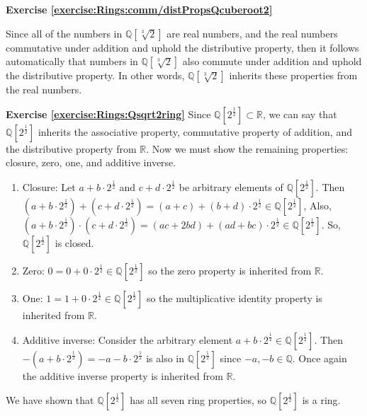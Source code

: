 \noindent\textbf{Exercise \ref{exercise:Rings:comm/distPropsQcuberoot2}}

Since all of the numbers in ${\mathbb Q}[\sqrt[3]{2}]$ are real numbers, and the real numbers commutative under addition and uphold the distributive property, then it follows automatically that numbers in ${\mathbb Q}[\sqrt[3]{2}]$ also commute under addition and uphold the distributive property.  In other words, ${\mathbb Q}[\sqrt[3]{2}]$ inherits these properties from the real numbers.

\noindent\textbf{Exercise \ref{exercise:Rings:Qsqrt2ring}}
Since ${\mathbb Q}[2^\frac{1}{2}]\subset{\mathbb R}$, we can say that ${\mathbb Q}[2^\frac{1}{2}]$ inherits the associative property, commutative property of addition, and the distributive property from ${\mathbb R}$.  Now we must show the remaining properties:  closure, zero, one, and additive inverse.
\begin{enumerate}
    \item Closure:  Let $a+b\cdot 2^\frac{1}{2}$ and $c+d\cdot 2^\frac{1}{2}$ be arbitrary elements of ${\mathbb Q}[2^\frac{1}{2}]$.  Then $(a+b\cdot 2^\frac{1}{2})+(c+d\cdot 2^\frac{1}{2})=(a+c)+(b+d)\cdot 2^\frac{1}{2}\in{\mathbb Q}[2^\frac{1}{2}]$,  Also, $(a+b\cdot 2^\frac{1}{2})\cdot (c+d\cdot 2^\frac{1}{2})=(ac+2bd)+(ad+bc)\cdot 2^\frac{1}{2}\in{\mathbb Q}[2^\frac{1}{2}]$.  So, ${\mathbb Q}[2^\frac{1}{2}]$ is closed.
    \item Zero:  $0=0+0\cdot 2^\frac{1}{2}\in{\mathbb Q}[2^\frac{1}{2}]$ so the zero property is inherited from ${\mathbb R}$.
    \item One:  $1=1+0\cdot 2^\frac{1}{2}\in{\mathbb Q}[2^\frac{1}{2}]$ so the multiplicative identity property is inherited from ${\mathbb R}$.
    \item Additive inverse:  Consider the arbitrary element $a+b\cdot 2^\frac{1}{2}\in{\mathbb Q}[2^\frac{1}{2}]$.  Then $-(a+b\cdot 2^\frac{1}{2})=-a-b\cdot 2^\frac{1}{2}$ is also in ${\mathbb Q}[2^\frac{1}{2}]$  since $-a,-b\in{\mathbb Q}$.  Once again the additive inverse property is inherited from ${\mathbb R}$.
\end{enumerate}
We have shown that ${\mathbb Q}[2^\frac{1}{2}]$ has all seven ring properties, so ${\mathbb Q}[2^\frac{1}{2}]$ is a ring.

